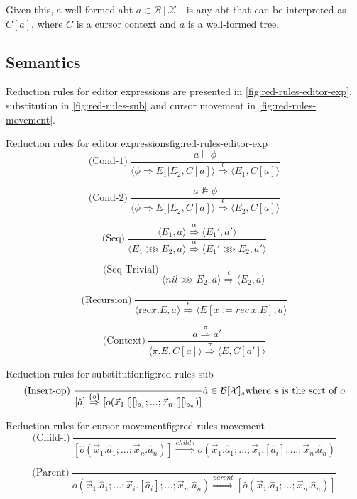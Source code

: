 Given this, a well-formed abt $a \in \mathcal{B[\mathcal{X}]}$ is any abt that 
can be interpreted as $C[\dot{a}]$, where $C$ is a cursor context and $\dot{a}$ is a well-formed tree.

\subsection{Semantics}
Reduction rules for editor expressions are presented in \cref{fig:red-rules-editor-exp}, substitution in \cref{fig:red-rules-sub} and cursor movement in \cref{fig:red-rules-movement}.



\begin{myfigure}{Reduction rules for editor expressions}{fig:red-rules-editor-exp}
    \[
        \text{(Cond-1)} \ \frac{a \models \phi}{\langle \phi \Rightarrow E_1|E_2, C[a] \rangle \stackrel{\epsilon}{\Rightarrow} \langle E_1, C[a] \rangle}
    \]

    \[
        \text{(Cond-2)} \ \frac{a \not\models \phi}{\langle \phi \Rightarrow E_1|E_2, C[a] \rangle \stackrel{\epsilon}{\Rightarrow} \langle E_2, C[a] \rangle}
    \]

    \[
        \text{(Seq)} \ \frac{\langle E_1,a \rangle \stackrel{\alpha}{\Rightarrow} \langle E_1',a' \rangle}{\langle E_1 \ggg E_2,a \rangle \stackrel{\alpha}{\Rightarrow} \langle E_1' \ggg E_2,a' \rangle}
    \]

    \[
        \text{(Seq-Trivial)} \ \frac{}{\langle nil \ggg E_2,a \rangle \stackrel{\epsilon}{\Rightarrow} \langle E_2, a \rangle}
    \]

    \[
        \text{(Recursion)} \ \frac{}{\langle \text{rec} x.E,a \rangle \stackrel{\epsilon}{\Rightarrow} \langle E[x:= rec \ x.E],a \rangle}
    \]

    \[
        \text{(Context)} \ \frac{a \stackrel{\pi}{\Rightarrow} a'}{\langle \pi.E,C[a] \rangle \stackrel{\pi}{\Rightarrow} \langle E,C[a'] \rangle}
    \]
\end{myfigure}

\begin{myfigure}{Reduction rules for substitution}{fig:red-rules-sub}
    \[
        \text{(Insert-op)} \ \frac{}{[\hat{a}] \stackrel{\{ o \}}{\Rightarrow} [o(\vec{x}_1.\hole_{s_1};...;\vec{x}_n.\hole_{s_n})]} \hat{a} \in \mathcal{B}[\mathcal{X}]_s \text{where } s \text{ is the sort of } o
    \]
\end{myfigure}

\begin{myfigure}{Reduction rules for cursor movement}{fig:red-rules-movement}
    \[
        \text{(Child-i)} \ \frac{}{[\hat{o}(\vec{x}_1.\hat{a}_1;...;\vec{x}_n.\hat{a}_n)] \stackrel{child \ i}{\Rightarrow} o(\vec{x}_1.\hat{a}_1;...;\vec{x}_i.[\hat{a}_i];...;\vec{x}_n.\hat{a}_n)}
    \]

    \[
        \text{(Parent)} \ \frac{}{o(\vec{x}_1.\hat{a}_1;...;\vec{x}_i.[\hat{a}_i];...;\vec{x}_n.\hat{a}_n) \stackrel{parent}{\Rightarrow} [\hat{o}(\vec{x}_1.\hat{a}_1;...;\vec{x}_n.\hat{a}_n)]}
    \]
\end{myfigure}

